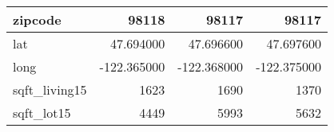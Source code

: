 \begin{table}[H]
\begin{tabular}{|l|r|r|r|}
\hline zipcode & \cellcolor[rgb]{0.9, 0.54, 0.52} 98118 & 98117 & 98117 \\
\hline lat & \cellcolor[rgb]{0.9, 0.54, 0.52} 47.694000 & 47.696600 & 47.697600 \\
\hline long & \cellcolor[rgb]{0.9, 0.54, 0.52} -122.365000 & \cellcolor[rgb]{0.9, 0.54, 0.52} -122.368000 & \cellcolor[rgb]{0.9, 0.54, 0.52} -122.375000 \\
\hline sqft\_living15 & \cellcolor[rgb]{0.9, 0.54, 0.52} 1623 & 1690 & 1370 \\
\hline sqft\_lot15 & \cellcolor[rgb]{0.9, 0.54, 0.52} 4449 & 5993 & 5632 \\
\hline
\end{tabular}
\end{table}
